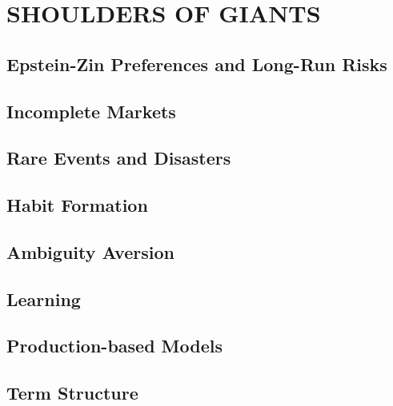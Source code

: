 \documentclass[
]{book}
\begin{document}
\hypertarget{part-shoulders-of-giants}{%
\part*{SHOULDERS OF GIANTS}\label{part-shoulders-of-giants}}

\hypertarget{epstein-zin-preferences-and-long-run-risks}{%
\chapter{Epstein-Zin Preferences and Long-Run Risks}\label{epstein-zin-preferences-and-long-run-risks}}

\hypertarget{incomplete-markets}{%
\chapter{Incomplete Markets}\label{incomplete-markets}}

\hypertarget{rare-events-and-disasters}{%
\chapter{Rare Events and Disasters}\label{rare-events-and-disasters}}

\hypertarget{habit-formation}{%
\chapter{Habit Formation}\label{habit-formation}}

\hypertarget{ambiguity-aversion}{%
\chapter{Ambiguity Aversion}\label{ambiguity-aversion}}

\hypertarget{learning}{%
\chapter{Learning}\label{learning}}

\hypertarget{production-based-models}{%
\chapter{Production-based Models}\label{production-based-models}}

\hypertarget{term-structure}{%
\chapter{Term Structure}\label{term-structure}}
\end{document}
